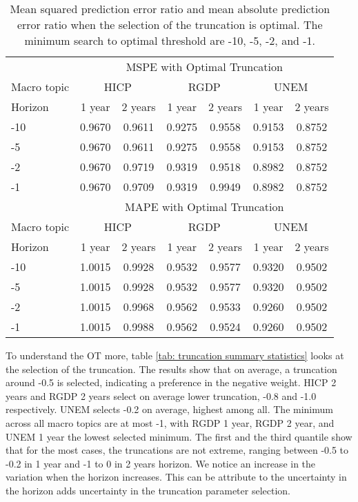 \documentclass[11pt]{article}
\begin{document}
\begin{table}[!h]
\centering
\caption{Mean squared prediction error ratio and mean absolute prediction error ratio when the selection of the truncation is optimal. The minimum search to optimal threshold are -10, -5, -2, and -1.}
\label{tab: oos mspe}
\begin{tabular}{lcccccc}
\hline
&\multicolumn{6}{c}{MSPE with Optimal Truncation}\\
\cmidrule(lr){2-7}
Macro topic & \multicolumn{2}{c}{HICP} & \multicolumn{2}{c}{RGDP} & \multicolumn{2}{c}{UNEM} \\
\cmidrule(lr){2-3} \cmidrule(lr){4-5}\cmidrule(lr){6-7}
Horizon     & 1 year & 2 years & 1 year & 2 years & 1 year & 2 years \\ 
\hline
-10 & 0.9670   & 0.9611   & 0.9275   & 0.9558   & 0.9153   & 0.8752   \\ 
-5  & 0.9670   & 0.9611   & 0.9275   & 0.9558   & 0.9153   & 0.8752   \\ 
-2  & 0.9670   & 0.9719   & 0.9319   & 0.9518   & 0.8982   & 0.8752   \\ 
-1  & 0.9670   & 0.9709   & 0.9319   & 0.9949   & 0.8982   & 0.8752   \\ 
\hline
&\multicolumn{6}{c}{MAPE with Optimal Truncation}\\
\cmidrule(lr){2-7}
Macro topic & \multicolumn{2}{c}{HICP} & \multicolumn{2}{c}{RGDP} & \multicolumn{2}{c}{UNEM} \\
\cmidrule(lr){2-3} \cmidrule(lr){4-5}\cmidrule(lr){6-7}
Horizon     & 1 year & 2 years & 1 year & 2 years & 1 year & 2 years \\ 
\hline
-10 & 1.0015   & 0.9928   & 0.9532   & 0.9577   & 0.9320   & 0.9502   \\
-5  & 1.0015   & 0.9928   & 0.9532   & 0.9577   & 0.9320   & 0.9502   \\
-2  & 1.0015   & 0.9968   & 0.9562   & 0.9533   & 0.9260   & 0.9502   \\
-1  & 1.0015   & 0.9988   & 0.9562   & 0.9524   & 0.9260   & 0.9502   \\
\hline
\end{tabular}
\end{table}

To understand the OT more, table
\ref{tab: truncation summary statistics} looks at the selection of the
truncation. The results show that on average, a truncation around -0.5
is selected, indicating a preference in the negative weight. HICP
2 years and RGDP 2 years select on average lower truncation, -0.8 and
-1.0 respectively. UNEM selects -0.2 on average, highest among all. The
minimum across all macro topics are at most -1, with RGDP 1 year, RGDP 2
year, and UNEM 1 year the lowest selected minimum. The first and the
third quantile show that for the most cases, the truncations are not
extreme, ranging between -0.5 to -0.2 in 1 year and -1 to 0 in 2 years
horizon. We notice an increase in the variation when the horizon
increases. This can be attribute to the uncertainty in the horizon adds
uncertainty in the truncation parameter selection.
\end{document}
